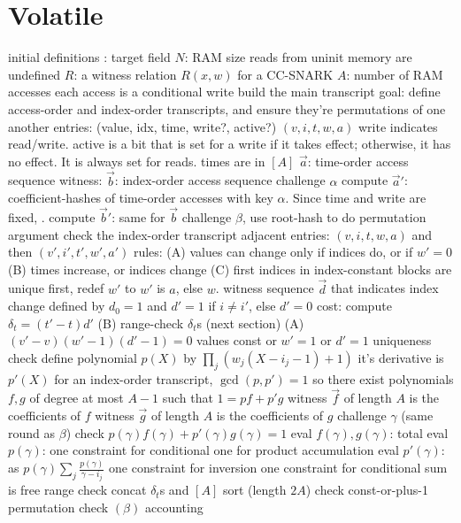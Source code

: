 \section{Volatile}
\begin{outline}
\1 initial definitions
  \2 \FF: target field
  \2 $N$: RAM size
  \2 reads from uninit memory are undefined
  \2 $R$: a witness relation $R(x, w)$ for a CC-SNARK
    \3 $A$: number of RAM accesses
      \4 each access is a conditional write
\1 build the main transcript
  \2 goal: define access-order and index-order transcripts, and ensure they're
  permutations of one another
  \2 entries: (value, idx, time, write?, active?) $(v, i, t, w, a)$
    \3 write indicates read/write.
    \3 active is a bit that is set for a write if it takes effect; otherwise, it has no effect. It is always set for reads.
    \3 times are in $[A]$
  \2 $\vec a$: time-order access sequence
  \2 witness: $\vec b$: index-order access sequence
  \2 challenge $\alpha$
  \2 compute $\vec a'$: coefficient-hashes of time-order accesses with key
  $\alpha$.
    \3 Since time and write are fixed, .
  \2 compute $\vec b'$: same for $\vec b$
    \3 
  \2 challenge $\beta$, use root-hash to do permutation argument
    \3 
\1 check the index-order transcript
  \2 adjacent entries: $(v, i, t, w, a)$ and then $(v', i', t', w', a')$
  \2 rules:
    \3 (A) values can change only if indices do, or if $w'=0$
    \3 (B) times increase, or indices change
    \3 (C) first indices in index-constant blocks are unique
  \2 first, redef $w'$ to $w'$ is $a$, else $w$.
    \3 
  \2 witness sequence $\vec d$ that indicates index change
    \3 defined by $d_0=1$ and $d'=1$ if $i \ne i'$, else $d'=0$
    \3 cost: 
  \2 compute $\delta_t = (t'-t)d'$ 
  \2 (B) range-check $\delta_t$s (next section)
  \2 (A) $(v'-v)(w'-1)(d'-1)=0$
    \3 
    \3 values const or $w'=1$ or $d'=1$
\1 uniqueness check
  \2 define polynomial $p(X)$ by $\prod_j (w_j(X - i_j - 1) + 1)$
  \2 it's derivative is $p'(X)$
  \2 for an index-order transcript, $\gcd(p,p')=1$
    \3 so there exist polynomials $f,g$ of degree at most $A-1$ such that $1 = pf + p'g$
  \2 witness $\vec f$ of length $A$ is the coefficients of $f$
  \2 witness $\vec g$ of length $A$ is the coefficients of $g$
  \2 challenge $\gamma$ (same round as $\beta$)
  \2 check $p(\gamma)f(\gamma) + p'(\gamma)g(\gamma)=1$
  \2 eval $f(\gamma), g(\gamma)$:  total
  \2 eval $p(\gamma)$: 
    \3 one constraint for conditional
    \3 one for product accumulation
  \2 eval $p'(\gamma)$: 
    \3 as $p(\gamma)\sum_j\frac{p(\gamma)}{\gamma-i_j}$
    \3 one constraint for inversion
    \3 one constraint for conditional
    \3 sum is free
\1 range check
  \2 concat $\delta_t$s and $[A]$
  \2 sort (length $2A$)
  \2 check const-or-plus-1 
  \2 permutation check $(\beta)$ 
\1 accounting
  \2 
\end{outline}

